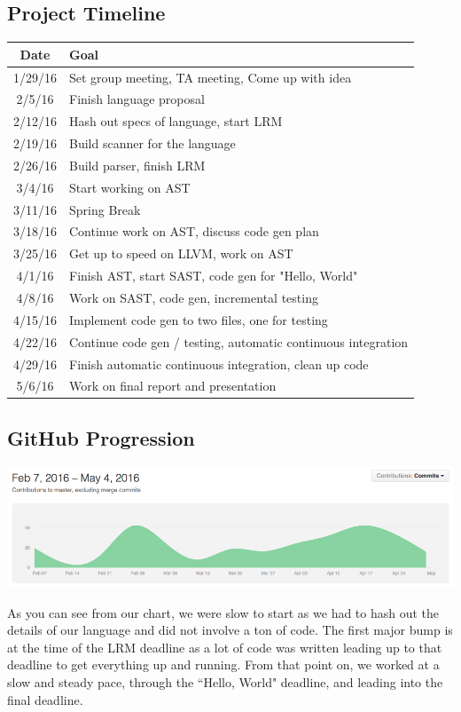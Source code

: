 \documentclass{article}
\begin{document}
\subsection{Project Timeline}
\begin{tabular}{| c | l |} \hline
	\textbf{Date} & \textbf{Goal} \\ \hline
	1/29/16 & Set group meeting, TA meeting, Come up with idea \\ \hline
	2/5/16 & Finish language proposal \\ \hline
	2/12/16 & Hash out specs of language, start LRM \\ \hline
	2/19/16 & Build scanner for the language \\ \hline
	2/26/16 & Build parser, finish LRM \\ \hline
	3/4/16 & Start working on AST \\ \hline
	3/11/16 & Spring Break \\ \hline
	3/18/16 & Continue work on AST, discuss code gen plan \\ \hline
	3/25/16 & Get up to speed on LLVM, work on AST \\ \hline
	4/1/16 & Finish AST, start SAST, code gen for "Hello, World" \\ \hline
	4/8/16 & Work on SAST, code gen, incremental testing \\ \hline
	4/15/16 & Implement code gen to two files, one for testing \\ \hline
	4/22/16 & Continue code gen / testing, automatic continuous integration \\ \hline
	4/29/16 & Finish automatic continuous integration, clean up code \\ \hline
	5/6/16 & Work on final report and presentation \\ \hline
\end{tabular}

\newpage
\subsection{GitHub Progression}
\includegraphics[width=\textwidth]{github_stats.png}
\par As you can see from our chart, we were slow to start as we had to hash out the details of our language and did not involve a ton of code.  The first major bump is at the time of the LRM deadline as a lot of code was written leading up to that deadline to get everything up and running.  From that point on, we worked at a slow and steady pace, through the ``Hello, World" deadline, and leading into the final deadline.
\end{document}
